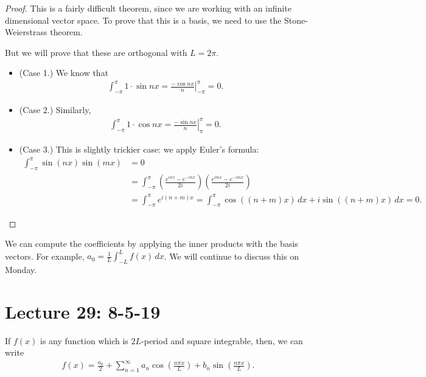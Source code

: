 \documentclass{article}
\begin{document}
\begin{proof}
  This is a fairly difficult theorem, since we are working with an infinite dimensional vector space.  To prove that this is a basis, we need to use the Stone-Weierstrass theorem.

  But we will prove that these are orthogonal with $L = 2 \pi$.

  \begin{itemize}
    \item (Case 1.) We know that
      \begin{align*}
        \int_{- \pi}^{\pi} 1 \cdot \sin nx = \left . \frac{- \cos nx}{n} \right |_{- \pi}^{\pi} = 0.
      \end{align*}
    \item (Case 2.) Similarly,
      \begin{align*}
        \int_{- \pi}^{\pi} 1 \cdot \cos nx = \left . \frac{- \sin nx}{n} \right |_{\pi}^{\pi} = 0.
      \end{align*}
    \item (Case 3.) This is slightly trickier case: we apply Euler's formula:
      \begin{align*}
        \int_{- \pi}^{\pi} \sin (n x) \sin (mx) &= 0 \\
        &= \int_{- \pi}^{\pi} \left ( \frac{e^{inx} - e^{-inx}}{2i} \right )   \left( \frac{e^{imx} - e^{-imx}}{2i} \right) \\
        &= \int_{- \pi}^{\pi} e^{i(n+m)x} = \int_{- \pi}^{\pi} \cos((n+m)x) \, dx + i \sin \left( (n+m)x \right) \, dx = 0.
      \end{align*}
  \end{itemize}
\end{proof}

We can compute the coefficients by applying the inner products with the basis vectors. For example, $a_0 = \frac{1}{L} \int_{-L}^{L} f(x) \, dx$.  We will continue to discuss this on Monday.
\section{Lecture 29: 8-5-19}

If $f(x)$ is any function which is $2L$-period and square integrable, then, we can write
\begin{align*}
  f(x) = \frac{a_0}{2} + \sum_{n=1}^{\infty} a_n \cos \left( \frac{n \pi x}{L} \right) + b_n \sin \left( \frac{n \pi x}{L} \right).
\end{align*}
\end{document}
